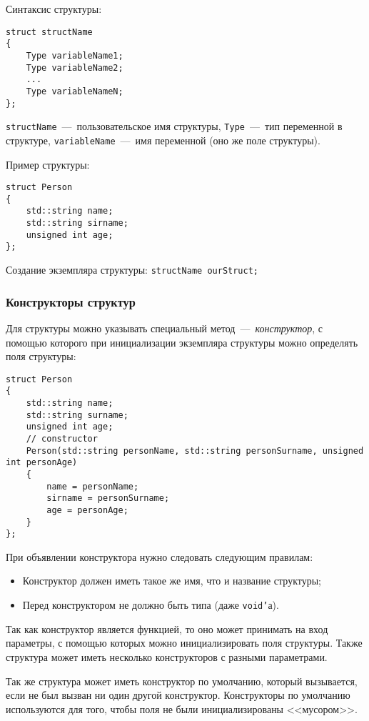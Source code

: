 Синтаксис структуры:
\begin{lstlisting}
struct structName
{
    Type variableName1;
    Type variableName2;
    ...
    Type variableNameN;
};
\end{lstlisting}

\lstinline|structName|~---~пользовательское имя структуры, \lstinline|Type|~---~тип переменной в структуре, \lstinline|variableName|~---~имя переменной (оно же поле структуры).

Пример структуры:
\begin{lstlisting}
struct Person
{
    std::string name;
    std::string sirname;
    unsigned int age;
};
\end{lstlisting}

Создание экземпляра структуры:
\lstinline{structName ourStruct;}

\subsubsection{Конструкторы структур}
Для структуры можно указывать специальный метод~---~\emph{конструктор}, с помощью которого при инициализации экземпляра структуры можно определять поля структуры:
\begin{lstlisting}
struct Person
{
    std::string name;
    std::string surname;
    unsigned int age;
    // constructor
    Person(std::string personName, std::string personSurname, unsigned int personAge)
    {
        name = personName;
        sirname = personSurname;
        age = personAge;
    }
};
\end{lstlisting}

При объявлении конструктора нужно следовать следующим правилам:
\begin{itemize}
    \item Конструктор должен иметь такое же имя, что и название структуры;
    \item Перед конструктором не должно быть типа (даже \texttt{void'}а).
\end{itemize}

Так как конструктор является функцией, то оно может принимать на вход параметры, с помощью которых можно инициализировать поля структуры. Также структура может иметь несколько конструкторов с разными параметрами.

Так же структура может иметь конструктор по умолчанию, который вызывается, если не был вызван ни один другой конструктор. Конструкторы по умолчанию используются для того, чтобы поля не были инициализированы <<мусором>>.

